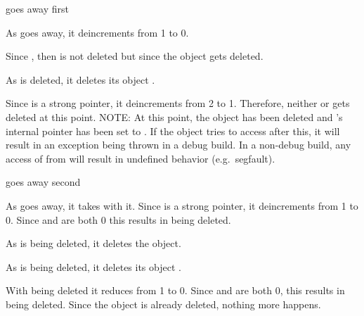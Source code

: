 \documentclass[pdf,ps2pdf,11pt]{SANDreport}
\begin{document}
\begin{description}

{}\item[a)] {} goes away first

  \begin{description}

  {}\item[a.1)] As {} goes away, it deincrements
  {} from 1 to 0.

  {}\item[a.2)] Since {}, then
  {} is not deleted but since
  {} the object {} gets
  deleted.

  {}\item[a.3)] As {} is deleted, it deletes its
  {} object {}.

  {}\item[a.4)] Since {} is a strong pointer, it
  deincrements {} from 2 to 1.  Therefore,
  neither {} or {} gets deleted at this point.
  NOTE: At this point, the object {} has been deleted and
  {}'s internal pointer has been set to {}.  If
  the {} object tries to access {} after this, it will
  result in an exception being thrown in a debug build.  In a
  non-debug build, any access of {} from {} will result
  in undefined behavior (e.g.\ segfault).

  \end{description}

{}\item[b)] {} goes away second

  \begin{description}

  {}\item[b.1)] As {} goes away, it takes {}
  with it.  Since {} is a strong pointer, it deincrements
  {} from 1 to 0.  Since
  {} and {} are both 0
  this results in {} being deleted.

  {}\item[b.2)] As {} is being deleted, it deletes the
  {} object.

  {}\item[b.3)] As {} is being deleted, it deletes its
  {} object {}.

  {}\item[b.4)] With {} being deleted it reduces
  {} from 1 to 0.  Since
  {} and {} are
  both 0, this results in {} being deleted.  Since the
  object {} is already deleted, nothing more happens.

  \end{description}

\end{description}
\end{document}
